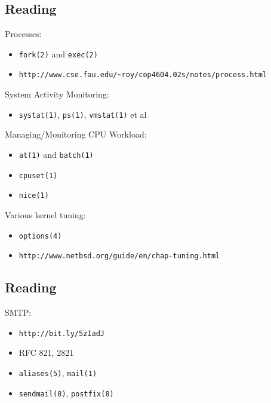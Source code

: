 \documentclass[xga]{xdvislides}
\begin{document}
\subsection{Reading}
Processes:
\begin{itemize}
	\item \verb+fork(2)+ and \verb+exec(2)+
	\item \verb+http://www.cse.fau.edu/~roy/cop4604.02s/notes/process.html+
\end{itemize}
System Activity Monitoring:
\begin{itemize}
	\item \verb+systat(1)+, \verb+ps(1)+, \verb+vmstat(1)+ et al
\end{itemize}
Managing/Monitoring CPU Workload:
\begin{itemize}
	\item \verb+at(1)+ and \verb+batch(1)+
	\item \verb+cpuset(1)+
	\item \verb+nice(1)+
\end{itemize}
Various kernel tuning:
\begin{itemize}
	\item \verb+options(4)+
	\item \verb+http://www.netbsd.org/guide/en/chap-tuning.html+
\end{itemize}

\subsection{Reading}
SMTP:
\begin{itemize}
	\item \verb+http://bit.ly/5zIadJ+
	\item RFC 821, 2821
	\item \verb+aliases(5)+, \verb+mail(1)+
	\item \verb+sendmail(8)+, \verb+postfix(8)+
\end{itemize}
\end{document}
